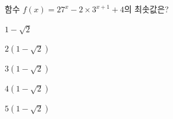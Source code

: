 함수 $f(x)=27^x-2\times 3^{x+1}+4$의 최솟값은?
\begin{choices32}{\rule[-3ex]{0pt}{8ex}$1-\sqrt{2}$}{\rule[-3ex]{0pt}{8ex}$2(1-\sqrt{2})$}{\rule[-3ex]{0pt}{8ex}$3(1-\sqrt{2})$}{\rule[-3ex]{0pt}{8ex}$4(1-\sqrt{2})$}{\rule[-3ex]{0pt}{8ex}$5(1-\sqrt{2})$}\end{choices32}
